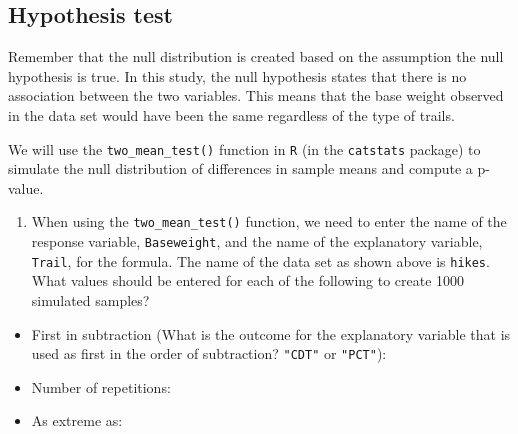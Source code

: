 \documentclass[
]{report}
\providecommand{\tightlist}{%
  \setlength{\itemsep}{0pt}\setlength{\parskip}{0pt}}
\begin{document}
\hypertarget{hypothesis-test-3}{%
\subsection*{Hypothesis test}\label{hypothesis-test-3}}

Remember that the null distribution is created based on the assumption the null hypothesis is true. In this study, the null hypothesis states that there is no association between the two variables. This means that the base weight observed in the data set would have been the same regardless of the type of trails.

We will use the \texttt{two\_mean\_test()} function in \texttt{R} (in the \texttt{catstats} package) to simulate the null distribution of differences in sample means and compute a p-value.

\begin{enumerate}
\def\labelenumi{\arabic{enumi}.}
\setcounter{enumi}{8}
\tightlist
\item
  When using the \texttt{two\_mean\_test()} function, we need to enter the name of the response variable, \texttt{Baseweight}, and the name of the explanatory variable, \texttt{Trail}, for the formula. The name of the data set as shown above is \texttt{hikes}. What values should be entered for each of the following to create 1000 simulated samples?
\end{enumerate}

\vspace{1mm}

\begin{itemize}
\tightlist
\item
  First in subtraction (What is the outcome for the explanatory variable that is used as first in the order of subtraction? \texttt{"CDT"} or \texttt{"PCT"}):
\end{itemize}

\vspace{.2in}

\begin{itemize}
\tightlist
\item
  Number of repetitions:
\end{itemize}

\vspace{.2in}

\begin{itemize}
\tightlist
\item
  As extreme as:
\end{itemize}
\end{document}
